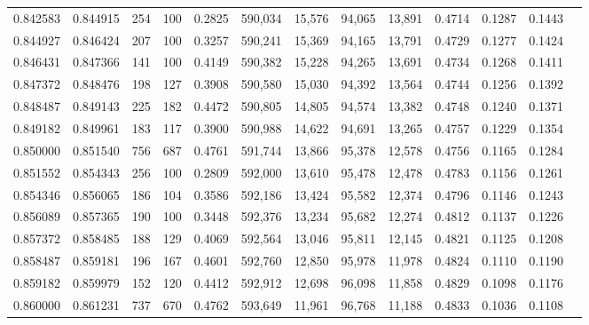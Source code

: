 \begin{tabular}{rrrrrrrrrrrrr}
0.842583 & 0.844915 &   254 & 100 &                                     0.2825 & 590,034 &  15,576 &  94,065 &  13,891 & 0.4714 & 0.1287 & 0.1443 \\
0.844927 & 0.846424 &   207 & 100 &                                     0.3257 & 590,241 &  15,369 &  94,165 &  13,791 & 0.4729 & 0.1277 & 0.1424 \\
0.846431 & 0.847366 &   141 & 100 &                                     0.4149 & 590,382 &  15,228 &  94,265 &  13,691 & 0.4734 & 0.1268 & 0.1411 \\
0.847372 & 0.848476 &   198 & 127 &                                     0.3908 & 590,580 &  15,030 &  94,392 &  13,564 & 0.4744 & 0.1256 & 0.1392 \\
0.848487 & 0.849143 &   225 & 182 &                                     0.4472 & 590,805 &  14,805 &  94,574 &  13,382 & 0.4748 & 0.1240 & 0.1371 \\
0.849182 & 0.849961 &   183 & 117 &                                     0.3900 & 590,988 &  14,622 &  94,691 &  13,265 & 0.4757 & 0.1229 & 0.1354 \\
0.850000 & 0.851540 &   756 & 687 &                                     0.4761 & 591,744 &  13,866 &  95,378 &  12,578 & 0.4756 & 0.1165 & 0.1284 \\
0.851552 & 0.854343 &   256 & 100 &                                     0.2809 & 592,000 &  13,610 &  95,478 &  12,478 & 0.4783 & 0.1156 & 0.1261 \\
0.854346 & 0.856065 &   186 & 104 &                                     0.3586 & 592,186 &  13,424 &  95,582 &  12,374 & 0.4796 & 0.1146 & 0.1243 \\
0.856089 & 0.857365 &   190 & 100 &                                     0.3448 & 592,376 &  13,234 &  95,682 &  12,274 & 0.4812 & 0.1137 & 0.1226 \\
0.857372 & 0.858485 &   188 & 129 &                                     0.4069 & 592,564 &  13,046 &  95,811 &  12,145 & 0.4821 & 0.1125 & 0.1208 \\
0.858487 & 0.859181 &   196 & 167 &                                     0.4601 & 592,760 &  12,850 &  95,978 &  11,978 & 0.4824 & 0.1110 & 0.1190 \\
0.859182 & 0.859979 &   152 & 120 &                                     0.4412 & 592,912 &  12,698 &  96,098 &  11,858 & 0.4829 & 0.1098 & 0.1176 \\
0.860000 & 0.861231 &   737 & 670 &                                     0.4762 & 593,649 &  11,961 &  96,768 &  11,188 & 0.4833 & 0.1036 & 0.1108 \\

\end{tabular}

